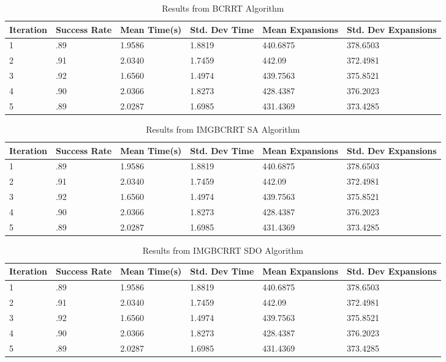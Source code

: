 \documentclass{article}
\begin{document}


\begin{table}[h]
  \caption{Results from BCRRT Algorithm}
  \label{BCRRT Results}
  \centering
  \begin{tabular}{llllll}
    \cmidrule(r){1-6}
   Iteration & Success Rate & Mean Time(s) & Std. Dev Time & Mean Expansions & Std. Dev Expansions\\
    \midrule
    1 & .89 & 1.9586 & 1.8819 & 440.6875 & 378.6503 \\
    2 & .91 & 2.0340 & 1.7459 & 442.09 & 372.4981 \\
    3 & .92 & 1.6560 & 1.4974 & 439.7563 & 375.8521 \\
    4 & .90 & 2.0366 & 1.8273 & 428.4387 & 376.2023 \\
    5 & .89 & 2.0287 & 1.6985 & 431.4369 & 373.4285 \\
    \bottomrule
  \end{tabular}
\end{table}

\begin{table}[h]
  \caption{Results from IMGBCRRT SA Algorithm}
  \label{IMGBCRRT SA Results}
  \centering
  \begin{tabular}{llllll}
    \cmidrule(r){1-6}
   Iteration & Success Rate & Mean Time(s) & Std. Dev Time & Mean Expansions & Std. Dev Expansions\\
    \midrule
    1 & .89 & 1.9586 & 1.8819 & 440.6875 & 378.6503 \\
    2 & .91 & 2.0340 & 1.7459 & 442.09 & 372.4981 \\
    3 & .92 & 1.6560 & 1.4974 & 439.7563 & 375.8521 \\
    4 & .90 & 2.0366 & 1.8273 & 428.4387 & 376.2023 \\
    5 & .89 & 2.0287 & 1.6985 & 431.4369 & 373.4285 \\
    \bottomrule
  \end{tabular}
\end{table}

\begin{table}[h]
  \caption{Results from IMGBCRRT SDO Algorithm}
  \label{IMGBCRRT SDO Results}
  \centering
  \begin{tabular}{llllll}
    \cmidrule(r){1-6}
   Iteration & Success Rate & Mean Time(s) & Std. Dev Time & Mean Expansions & Std. Dev Expansions\\
    \midrule
    1 & .89 & 1.9586 & 1.8819 & 440.6875 & 378.6503 \\
    2 & .91 & 2.0340 & 1.7459 & 442.09 & 372.4981 \\
    3 & .92 & 1.6560 & 1.4974 & 439.7563 & 375.8521 \\
    4 & .90 & 2.0366 & 1.8273 & 428.4387 & 376.2023 \\
    5 & .89 & 2.0287 & 1.6985 & 431.4369 & 373.4285 \\
    \bottomrule
  \end{tabular}
\end{table}
\end{document}

